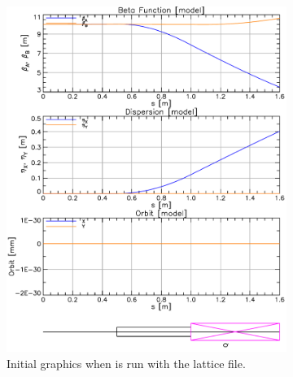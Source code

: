 \documentclass{hitec}
\begin{document}
\begin{figure}[tb]
  \centering
  \begin{subfigure}[b]{0.45\textwidth}
    \includegraphics[width=\textwidth]{lat-init.pdf}
    \caption{Initial graphics when \tao is run with the  lattice file.}
    \label{f:lat.init}
  \end{subfigure}
  \hfil
  \begin{subfigure}[b]{0.45\textwidth}

\end{subfigure}
\end{figure}
\end{document}
